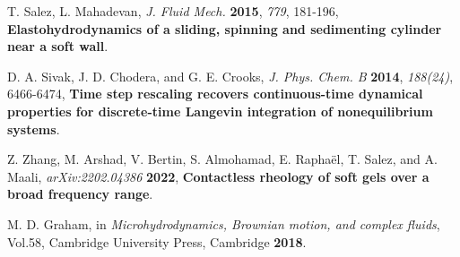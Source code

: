 \documentclass[fleqn,10pt]{InternshipReport-ENS-PSL}
\begin{document}
\begin{thebibliography}{99}
T. Salez, L. Mahadevan, {\it J. Fluid Mech.} {\bf 2015}, {\it 779}, 181-196, {\bf Elastohydrodynamics of a sliding, spinning and sedimenting cylinder near a soft wall}.

D. A. Sivak, J. D. Chodera, and G. E. Crooks, {\it J. Phys. Chem. B} {\bf 2014}, {\it 188(24)}, 6466-6474, {\bf Time step rescaling recovers continuous-time dynamical properties for discrete-time Langevin integration of nonequilibrium systems}.

Z. Zhang, M. Arshad, V. Bertin, S. Almohamad, E. Raphaël, T. Salez, and A. Maali, {\it arXiv:2202.04386} {\bf 2022}, {\bf Contactless rheology of soft gels over a broad frequency range}.


M. D. Graham, in {\it Microhydrodynamics, Brownian motion, and complex fluids}, Vol.58, Cambridge University Press, Cambridge {\bf 2018}.















\end{thebibliography}
\end{document}
